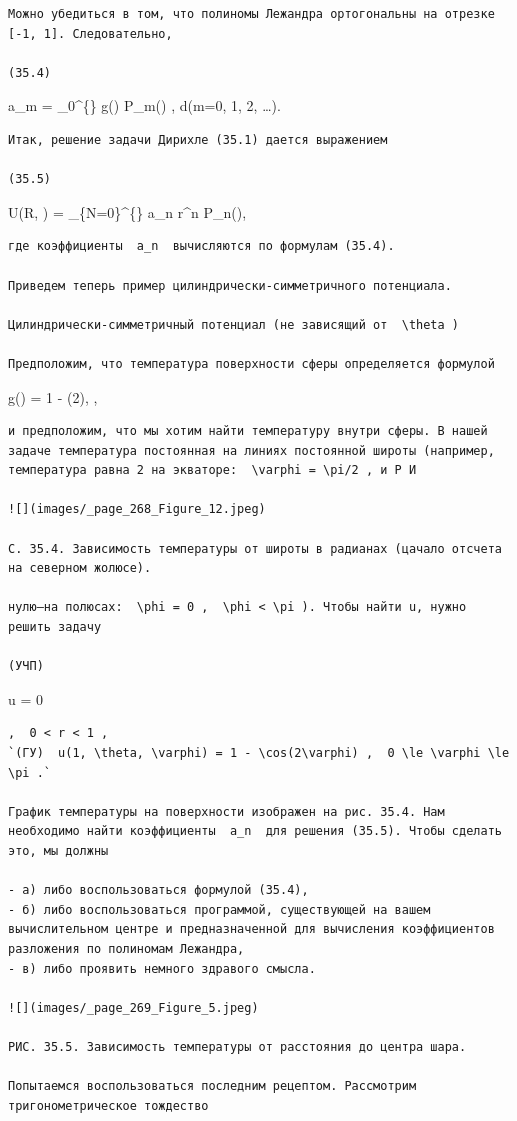 \documentclass[
  ukrainian,
]{article}
\begin{document}
\begin{verbatim}
Можно убедиться в том, что полиномы Лежандра ортогональны на отрезке [-1, 1]. Следовательно,

(35.4)
\end{verbatim}

a\_m =  \int\_0\^{}\{\pi\} g(\varphi) P\_m(\cos \varphi)
\sin \varphi , d\varphi \quad (m=0, 1, 2, \ldots).

\begin{verbatim}
Итак, решение задачи Дирихле (35.1) дается выражением

(35.5)
\end{verbatim}

U(R, \varphi) = \sum\_\{N=0\}\^{}\{\infty\} a\_n r\^{}n
P\_n(\cos \varphi),

\begin{verbatim}
где коэффициенты  a_n  вычисляются по формулам (35.4).

Приведем теперь пример цилиндрически-симметричного потенциала.

Цилиндрически-симметричный потенциал (не зависящий от  \theta )

Предположим, что температура поверхности сферы определяется формулой
\end{verbatim}

g(\varphi) = 1 - \cos(2\varphi), 
\leqslant \varphi \leqslant \pi,

\begin{verbatim}
и предположим, что мы хотим найти температуру внутри сферы. В нашей задаче температура постоянная на линиях постоянной широты (например, температура равна 2 на экваторе:  \varphi = \pi/2 , и Р И

![](images/_page_268_Figure_12.jpeg)

С. 35.4. Зависимость температуры от широты в радианах (цачало отсчета на северном жолюсе).

нулю—на полюсах:  \phi = 0 ,  \phi < \pi ). Чтобы найти u, нужно решить задачу

(УЧП)
\end{verbatim}

\Delta u = 0

\begin{verbatim}
,  0 < r < 1 ,  
`(ГУ)  u(1, \theta, \varphi) = 1 - \cos(2\varphi) ,  0 \le \varphi \le \pi .`

График температуры на поверхности изображен на рис. 35.4. Нам необходимо найти коэффициенты  a_n  для решения (35.5). Чтобы сделать это, мы должны

- а) либо воспользоваться формулой (35.4),
- б) либо воспользоваться программой, существующей на вашем вычислительном центре и предназначенной для вычисления коэффициентов разложения по полиномам Лежандра,
- в) либо проявить немного здравого смысла.

![](images/_page_269_Figure_5.jpeg)

РИС. 35.5. Зависимость температуры от расстояния до центра шара.

Попытаемся воспользоваться последним рецептом. Рассмотрим тригонометрическое тождество
\end{verbatim}
\end{document}
